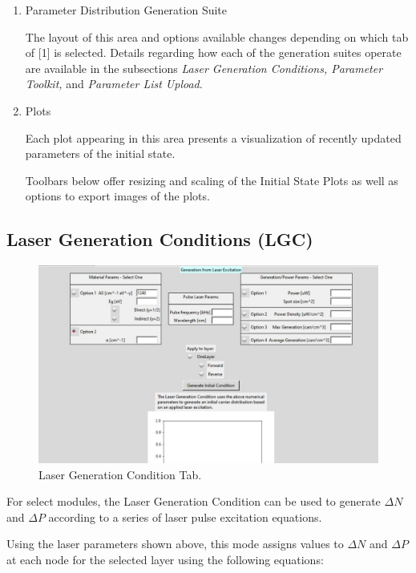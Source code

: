 \documentclass[11pt,letterpaper,titlepage]{article}
\begin{document}
\begin{enumerate}
				\item Parameter Distribution Generation Suite
				\par The layout of this area and options available changes depending on which tab of [1] is selected. Details regarding how each of the generation suites operate are available in the subsections \textit{Laser Generation Conditions, Parameter Toolkit,} and \textit{Parameter List Upload}.
				
				\item Plots
				\par Each plot appearing in this area presents a visualization of recently updated parameters of the initial state.
				
				\par Toolbars below offer resizing and scaling of the Initial State Plots as well as options to export images of the plots.
				
			\end{enumerate}
		
			\subsection {Laser Generation Conditions (LGC)}
			\begin{figure}[H]
				\label{fig:LGC_blank}
				\centering
				\includegraphics[scale=0.5]{"LGC_blank"}
				\caption{Laser Generation Condition Tab.}
			\end{figure}
		
			\par For select modules, the Laser Generation Condition can be used to generate $\Delta N$ and $\Delta P$ according to a series of laser pulse excitation equations.
			
			\par Using the laser parameters shown above, this mode assigns values to $\Delta N$ and $\Delta P$ at each node for the selected layer using the following equations:
	
\end{document}
